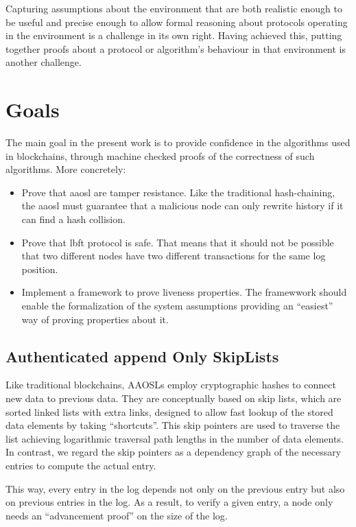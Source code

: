 Capturing assumptions about the environment that are both realistic enough to be useful and precise enough to allow formal reasoning about protocols operating in the environment is a challenge in its own right. Having achieved this,  
putting together proofs about a protocol or algorithm's behaviour in that environment is another challenge.

\section{Goals}
The main goal in the present work is to provide confidence in the algorithms used in blockchains, through machine checked proofs of the correctness of such algorithms. More concretely:

\begin{itemize}
    \item Prove that \gls{aaosl} are tamper resistance. Like the traditional hash-chaining, the \gls{aaosl} must guarantee that a malicious node can only rewrite history if it can find a hash collision.
    \item Prove that \gls{lbft} protocol is safe. That means that it should not be possible that two different nodes have two different transactions for the same log position.
    \item Implement a framework to prove liveness properties. The framewwork should enable the formalization of the system assumptions providing an ``easiest'' way of proving properties about it.
\end{itemize}

\iffalse
\subsection{Authenticated append Only SkipLists}

Like traditional blockchains, AAOSLs employ cryptographic 
hashes to connect new data to previous data. They are conceptually based on skip lists, which are sorted linked lists with extra links, designed to allow fast lookup of the stored data elements by taking ``shortcuts''. This skip pointers are used to traverse the list achieving logarithmic traversal path lengths in the number of data elements. In contrast, we regard the skip pointers as a dependency graph of the necessary entries to compute the actual entry. 

This way, every entry in the log depends not only on the previous entry but also on previous entries in the log. As a result, to verify a given entry, a node only needs an ``advancement proof'' on the size of the log. 

